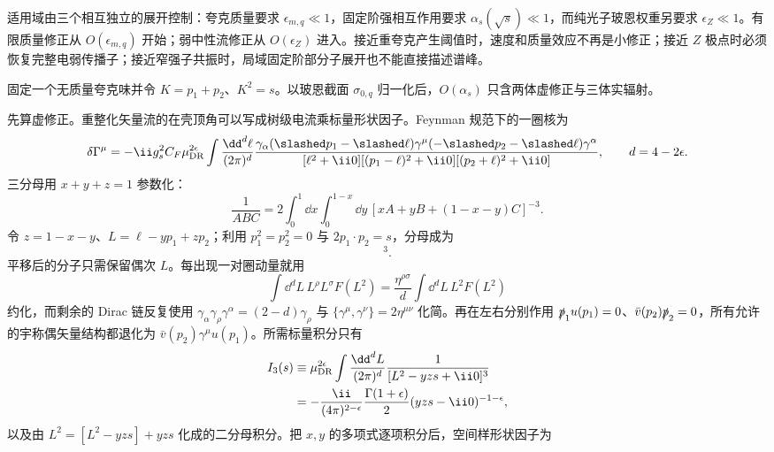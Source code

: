 适用域由三个相互独立的展开控制：夸克质量要求 $\epsilon_{m,q}\ll1$，固定阶强相互作用要求 $\alpha_s(\sqrt{s})\ll1$，而纯光子玻恩权重另要求 $\epsilon_Z\ll1$。有限质量修正从 $O(\epsilon_{m,q})$ 开始；弱中性流修正从 $O(\epsilon_Z)$ 进入。接近重夸克产生阈值时，速度和质量效应不再是小修正；接近 $Z$ 极点时必须恢复完整电弱传播子；接近窄强子共振时，局域固定阶部分子展开也不能直接描述谱峰。

\begin{derivation}
固定一个无质量夸克味并令 $K=p_1+p_2$、$K^2=s$。以玻恩截面 $\sigma_{0,q}$ 归一化后，$O(\alpha_s)$ 只含两体虚修正与三体实辐射。

先算虚修正。重整化矢量流的在壳顶角可以写成树级电流乘标量形状因子。Feynman 规范下的一圈核为
\begin{equation*}
 \delta\Gamma^\mu
 =-\ii g_s^2 C_F\mu_{\rm DR}^{2\epsilon}
 \int\frac{\dd^d\ell}{(2\pi)^d}
 \frac{\gamma_\alpha(\slashed p_1-\slashed\ell)\gamma^\mu
 (-\slashed p_2-\slashed\ell)\gamma^\alpha}
 {[\ell^2+\ii0][(p_1-\ell)^2+\ii0][(p_2+\ell)^2+\ii0]},
 \qquad d=4-2\epsilon .
\end{equation*}
三分母用 $x+y+z=1$ 参数化：
\begin{equation*}
 \frac1{ABC}
 =2\int_0^1\dd x\int_0^{1-x}\dd y\,
 [xA+yB+(1-x-y)C]^{-3}.
\end{equation*}
令 $z=1-x-y$、$L=\ell-yp_1+zp_2$；利用 $p_1^2=p_2^2=0$ 与 $2p_1\!\cdot p_2=s$，分母成为
\begin{equation*}
 [L^2-yzs+\ii0]^3.
\end{equation*}
平移后的分子只需保留偶次 $L$。每出现一对圈动量就用
\begin{equation*}
 \int\dd^dL\,L^\rho L^\sigma F(L^2)
 =\frac{\eta^{\rho\sigma}}d\int\dd^dL\,L^2F(L^2)
\end{equation*}
约化，而剩余的 Dirac 链反复使用 $\gamma_\alpha\gamma_\rho\gamma^\alpha=(2-d)\gamma_\rho$ 与 $\{\gamma^\mu,\gamma^\nu\}=2\eta^{\mu\nu}$ 化简。再在左右分别作用 $\slashed p_1u(p_1)=0$、$\bar v(p_2)\slashed p_2=0$，所有允许的宇称偶矢量结构都退化为 $\bar v(p_2)\gamma^\mu u(p_1)$。所需标量积分只有
\begin{align*}
 I_3(s)
 &\equiv\mu_{\rm DR}^{2\epsilon}
 \int\frac{\dd^dL}{(2\pi)^d}\frac1{[L^2-yzs+\ii0]^3}\\
 &=-\frac{\ii}{(4\pi)^{2-\epsilon}}
 \frac{\Gamma(1+\epsilon)}{2}
 (yzs-\ii0)^{-1-\epsilon},
\end{align*}
以及由 $L^2=[L^2-yzs]+yzs$ 化成的二分母积分。把 $x,y$ 的多项式逐项积分后，空间样形状因子为

\end{derivation}
